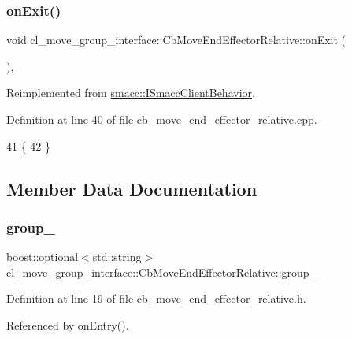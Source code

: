 \subsubsection{\texorpdfstring{on\+Exit()}{onExit()}}
{\footnotesize\ttfamily void cl\+\_\+move\+\_\+group\+\_\+interface\+::\+Cb\+Move\+End\+Effector\+Relative\+::on\+Exit (\begin{DoxyParamCaption}{ }\end{DoxyParamCaption})\hspace{0.3cm}{\ttfamily [override]}, {\ttfamily [virtual]}}



Reimplemented from \hyperlink{classsmacc_1_1ISmaccClientBehavior_a36bf771905e3bf750909a15e4215a9b3}{smacc\+::\+I\+Smacc\+Client\+Behavior}.



Definition at line 40 of file cb\+\_\+move\+\_\+end\+\_\+effector\+\_\+relative.\+cpp.


\begin{DoxyCode}
41     \{
42     \}
\end{DoxyCode}


\subsection{Member Data Documentation}
\mbox{\label{classcl__move__group__interface_1_1CbMoveEndEffectorRelative_a1bb9caf9c715a5d10ea38ab46c297adb}} 
\subsubsection{\texorpdfstring{group\+\_\+}{group\_}}
{\footnotesize\ttfamily boost\+::optional$<$std\+::string$>$ cl\+\_\+move\+\_\+group\+\_\+interface\+::\+Cb\+Move\+End\+Effector\+Relative\+::group\+\_\+}



Definition at line 19 of file cb\+\_\+move\+\_\+end\+\_\+effector\+\_\+relative.\+h.



Referenced by on\+Entry().

